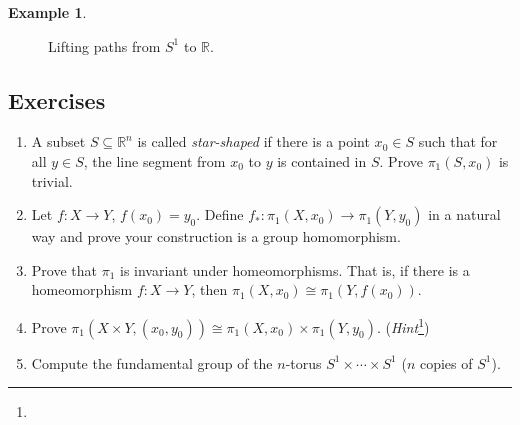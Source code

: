 \documentclass{article}
\theoremstyle{definition}
\newtheorem{exa}[thm]{Example}
\theoremstyle{remark}
\newcommand{\R}{\mathbb R}
\numberwithin{figure}{section}
\begin{document}
\begin{exa}
\begin{figure}[h]
		\caption{Lifting paths from $S^1$ to $\R$.}
		\label{fig:path lifting S^1}
	\end{figure}
\end{exa}

\subsection*{Exercises}
\begin{enumerate}
	\item A subset $S \subseteq \R^n$ is called \emph{star-shaped} if there is a point $x_0 \in S$ such that for all $y \in S$, the line segment from $x_0$ to $y$ is contained in $S$. Prove $\pi_1(S, x_0)$ is trivial.
	
	\item Let $f : X \to Y$, $f(x_0) = y_0$. Define $f_* : \pi_1(X, x_0) \to \pi_1(Y, y_0)$ in a natural way and prove your construction is a group homomorphism.
	
	\item Prove that $\pi_1$ is invariant under homeomorphisms. That is, if there is a homeomorphism $f : X \to Y$, then $\pi_1(X, x_0) \cong \pi_1(Y, f(x_0))$.
	
	\item Prove $\pi_1(X \times Y, (x_0, y_0)) \cong \pi_1(X, x_0) \times \pi_1(Y, y_0)$. (\emph{Hint}\footnote{})
	
	\item Compute the fundamental group of the $n$-torus $S^1 \times \cdots \times S^1$ ($n$ copies of $S^1$).
\end{enumerate}
\end{document}
